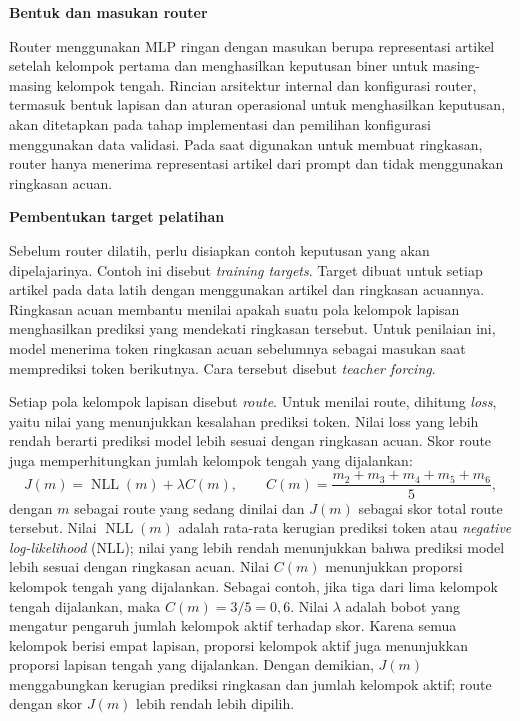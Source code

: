 \medskip
\noindent\textbf{Bentuk dan masukan router}\par\smallskip

Router menggunakan MLP ringan dengan masukan berupa representasi artikel setelah kelompok pertama dan menghasilkan keputusan biner untuk masing-masing kelompok tengah. Rincian arsitektur internal dan konfigurasi router, termasuk bentuk lapisan dan aturan operasional untuk menghasilkan keputusan, akan ditetapkan pada tahap implementasi dan pemilihan konfigurasi menggunakan data validasi. Pada saat digunakan untuk membuat ringkasan, router hanya menerima representasi artikel dari prompt dan tidak menggunakan ringkasan acuan.

\medskip
\noindent\textbf{Pembentukan target pelatihan}\par\smallskip

Sebelum router dilatih, perlu disiapkan contoh keputusan yang akan dipelajarinya. Contoh ini disebut \textit{training targets}. Target dibuat untuk setiap artikel pada data latih dengan menggunakan artikel dan ringkasan acuannya. Ringkasan acuan membantu menilai apakah suatu pola kelompok lapisan menghasilkan prediksi yang mendekati ringkasan tersebut. Untuk penilaian ini, model menerima token ringkasan acuan sebelumnya sebagai masukan saat memprediksi token berikutnya. Cara tersebut disebut \textit{teacher forcing}.

Setiap pola kelompok lapisan disebut \textit{route}. Untuk menilai route, dihitung \textit{loss}, yaitu nilai yang menunjukkan kesalahan prediksi token. Nilai loss yang lebih rendah berarti prediksi model lebih sesuai dengan ringkasan acuan. Skor route juga memperhitungkan jumlah kelompok tengah yang dijalankan:
\begin{equation}
  J(m) = \operatorname{NLL}(m) + \lambda C(m),
  \qquad C(m) = \frac{m_2+m_3+m_4+m_5+m_6}{5},
  \label{eq:route-objective}
\end{equation}
\noindent dengan $m$ sebagai route yang sedang dinilai dan $J(m)$ sebagai skor total route tersebut. Nilai $\operatorname{NLL}(m)$ adalah rata-rata kerugian prediksi token atau \textit{negative log-likelihood} (NLL); nilai yang lebih rendah menunjukkan bahwa prediksi model lebih sesuai dengan ringkasan acuan. Nilai $C(m)$ menunjukkan proporsi kelompok tengah yang dijalankan. Sebagai contoh, jika tiga dari lima kelompok tengah dijalankan, maka $C(m)=3/5=0{,}6$. Nilai $\lambda$ adalah bobot yang mengatur pengaruh jumlah kelompok aktif terhadap skor. Karena semua kelompok berisi empat lapisan, proporsi kelompok aktif juga menunjukkan proporsi lapisan tengah yang dijalankan. Dengan demikian, $J(m)$ menggabungkan kerugian prediksi ringkasan dan jumlah kelompok aktif; route dengan skor $J(m)$ lebih rendah lebih dipilih.

